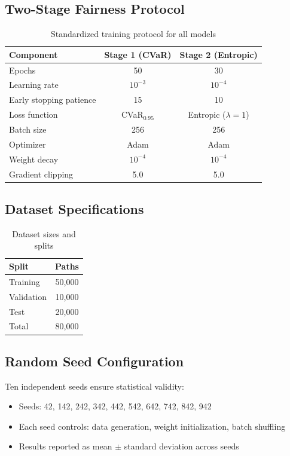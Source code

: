 \subsection{Two-Stage Fairness Protocol}

\begin{table}[h]
\centering
\caption{Standardized training protocol for all models}
\begin{tabular}{lcc}
\toprule
\textbf{Component} & \textbf{Stage 1 (CVaR)} & \textbf{Stage 2 (Entropic)} \\
\midrule
Epochs & 50 & 30 \\
Learning rate & $10^{-3}$ & $10^{-4}$ \\
Early stopping patience & 15 & 10 \\
Loss function & CVaR$_{0.95}$ & Entropic ($\lambda=1$) \\
Batch size & 256 & 256 \\
Optimizer & Adam & Adam \\
Weight decay & $10^{-4}$ & $10^{-4}$ \\
Gradient clipping & 5.0 & 5.0 \\
\bottomrule
\end{tabular}
\end{table}

\subsection{Dataset Specifications}

\begin{table}[h]
\centering
\caption{Dataset sizes and splits}
\begin{tabular}{lc}
\toprule
\textbf{Split} & \textbf{Paths} \\
\midrule
Training & 50,000 \\
Validation & 10,000 \\
Test & 20,000 \\
\midrule
Total & 80,000 \\
\bottomrule
\end{tabular}
\end{table}

\subsection{Random Seed Configuration}

Ten independent seeds ensure statistical validity:
\begin{itemize}[noitemsep]
    \item Seeds: 42, 142, 242, 342, 442, 542, 642, 742, 842, 942
    \item Each seed controls: data generation, weight initialization, batch shuffling
    \item Results reported as mean $\pm$ standard deviation across seeds
\end{itemize}

